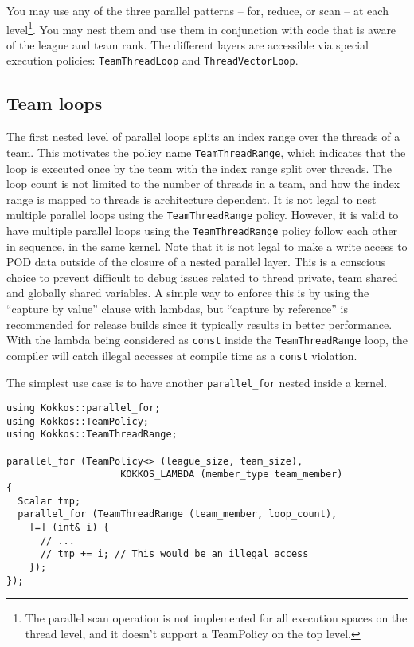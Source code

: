 You may use any of the three parallel patterns -- for, reduce, or scan -- at each level\footnote{The parallel scan operation is not implemented for all execution spaces on the thread level, and it doesn't support a TeamPolicy on the top level.}.
You may nest them and use them in conjunction with code that is aware of the league and team rank.
The different layers are accessible via special execution policies:
\lstinline|TeamThreadLoop| and \lstinline|ThreadVectorLoop|. 

\subsection{Team loops}\label{SS:Hierarchical:Nested:Loops:Team}

The first nested level of parallel loops splits an index range over the threads of a team. 
This motivates the policy name \lstinline|TeamThreadRange|, 
which indicates that the loop is executed once by the team with the index range split over threads.
The loop count is not limited to the number of threads in a team, and how the index range is mapped to threads is architecture dependent.
It is not legal to nest multiple parallel loops using the \lstinline!TeamThreadRange! policy.
However, it is valid to have multiple parallel loops using the \lstinline!TeamThreadRange! policy follow each other in sequence, in the same kernel.  
Note that it is not legal to make a write access to POD data outside of the closure of a nested parallel layer. 
This is a conscious choice to prevent difficult to debug issues related to thread private, team shared and globally shared variables. 
A simple way to enforce this is by using the ``capture by value'' clause with lambdas, 
but ``capture by reference'' is recommended for release builds since it typically results in better performance.
With the lambda being considered as \lstinline|const| inside the \lstinline!TeamThreadRange! loop,
the compiler will catch illegal accesses at compile time as a \lstinline|const| violation.  

The simplest use case is to have another \lstinline|parallel_for| nested inside a kernel. 
\begin{lstlisting}
using Kokkos::parallel_for;
using Kokkos::TeamPolicy;
using Kokkos::TeamThreadRange;

parallel_for (TeamPolicy<> (league_size, team_size), 
                    KOKKOS_LAMBDA (member_type team_member)
{
  Scalar tmp;
  parallel_for (TeamThreadRange (team_member, loop_count), 
    [=] (int& i) {
      // ...
      // tmp += i; // This would be an illegal access
    });
});
\end{lstlisting}


